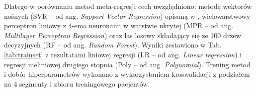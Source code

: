 Dlatego w porównaniu metod meta-regresji cech uwzględniono: metodę wektorów nośnych (SVR -- od ang. \textit{Support Vector Regression}) opisaną w \cite{SVR_drucker}, wielowarstwowy perceptron liniowy z 4-ema neuronami w warstwie ukrytej (MPR -- od ang. \textit{Multilayer Perceptron Regression}) oraz las losowy składający się ze 100 drzew decyzyjnych (RF -- od ang. \textit{Random Forest}). Wyniki zestawiono w Tab. \ref{tab:trainset} z rezultatami liniowej regresji (LR -- od ang. \textit{Linear regression}) i regresji nieliniowej drugiego stopnia (Poly -- od ang. \textit{Polynomial}). Trening metod i dobór hiperparametrów wykonano z wykorzystaniem kroswalidacji z podziałem na 4 segmenty i zbioru treningowego pacjentów.

